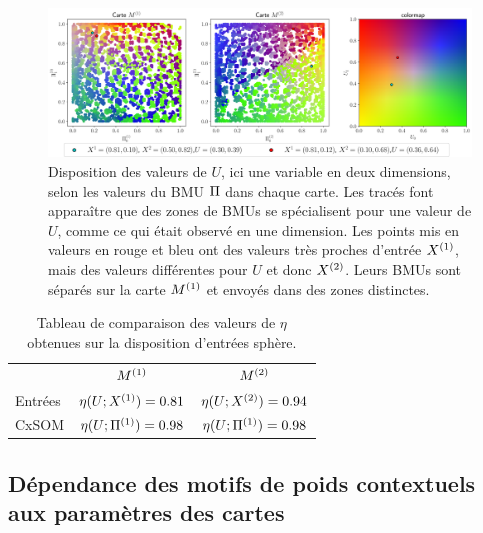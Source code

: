 \documentclass[../main]{subfiles}
\begin{document}
\begin{figure}[ht]
	\includegraphics[width=\textwidth]{U_BMU_2SOM_2D.png}
	\caption{Disposition des valeurs de $U$, ici une variable en deux dimensions, selon les valeurs du BMU $\Pi$ dans chaque carte. Les tracés font apparaître que des zones de BMUs se spécialisent pour une valeur de $U$, comme ce qui était observé en une dimension. Les points mis en valeurs en rouge et bleu ont des valeurs très proches d'entrée $X^{({1})}$, mais des valeurs différentes pour $U$ et donc $X^{({2})}$. Leurs BMUs sont séparés sur la carte $M^{({1})}$ et envoyés dans des zones distinctes.
	\label{fig:U_BMU}}
\end{figure}


\begin{table}[hb]
	\caption{Tableau de comparaison des valeurs de $\eta$ obtenues sur la disposition d'entrées sphère. \label{tab:eta2D}}
	\centering\begin{tabular}{lcc}
						&$M^{({1})}$ 					& $M^{({2})}$ 						\\
		Entrées 		& $\eta(U;X^{({1})}) = 0.81$ & $\eta(U;X^{({2})}) = 0.94$  \\
		CxSOM  	 		& $\eta(U;\Pi^{({1})}) = 0.98$ & $\eta(U;\Pi^{({1})}) = 0.98$ 	\\
	\end{tabular}
\end{table}

\subsection{Dépendance des motifs de poids contextuels aux paramètres des cartes \label{par:params2D}}
\end{document}
